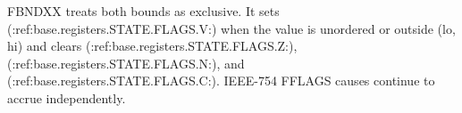 FBNDXX treats both bounds as exclusive. It sets (:ref:base.registers.STATE.FLAGS.V:) when the value is unordered or outside (lo, hi) and clears (:ref:base.registers.STATE.FLAGS.Z:), (:ref:base.registers.STATE.FLAGS.N:), and (:ref:base.registers.STATE.FLAGS.C:). IEEE-754 FFLAGS causes continue to accrue independently.
